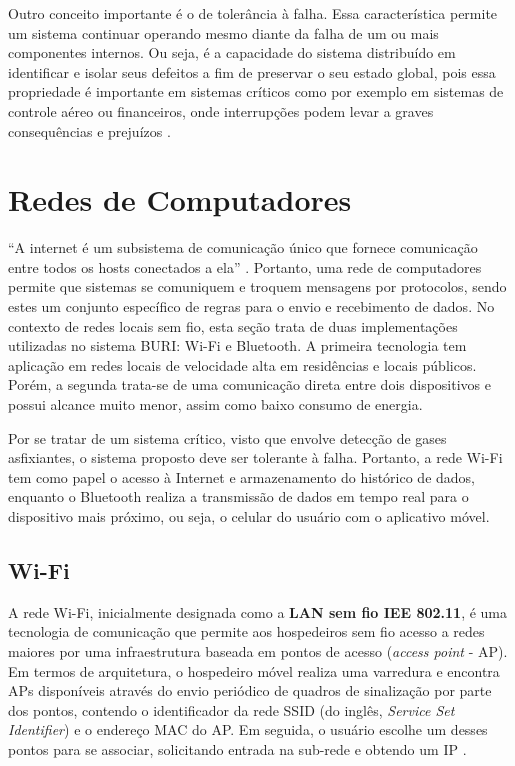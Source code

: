 Outro conceito importante é o de tolerância à falha. Essa característica permite um sistema continuar operando mesmo diante da falha de um ou mais 
componentes internos. Ou seja, é a capacidade do sistema distribuído em identificar e isolar seus defeitos a fim de preservar o seu estado global, pois essa propriedade é 
importante em sistemas críticos como por exemplo em sistemas de controle aéreo ou financeiros, onde interrupções podem levar a graves consequências e prejuízos \cite[pp. 528]{sistemas-distribuidos-coulouris2013}.

\section{Redes de Computadores}

``A internet é um subsistema de comunicação único que fornece comunicação entre todos os hosts conectados a ela'' \cite[pp. 96]{sistemas-distribuidos-coulouris2013}. Portanto, uma rede de computadores 
permite que sistemas se comuniquem e troquem mensagens por protocolos, sendo estes um conjunto específico de regras para o envio e recebimento de dados. No contexto de redes locais sem fio, esta seção trata de duas 
implementações utilizadas no sistema BURI: Wi-Fi e Bluetooth. A primeira tecnologia tem aplicação em redes locais de velocidade alta em residências e locais públicos. Porém, a segunda trata-se de uma comunicação direta entre dois 
dispositivos e possui alcance muito menor, assim como baixo consumo de energia.

Por se tratar de um sistema crítico, visto que envolve detecção de gases asfixiantes, o sistema proposto deve ser tolerante à falha. Portanto, a rede Wi-Fi tem como papel o acesso à Internet e armazenamento do histórico de dados, enquanto o 
Bluetooth realiza a transmissão de dados em tempo real para o dispositivo mais próximo, ou seja, o celular do usuário com o aplicativo móvel.

\subsection{Wi-Fi}

A rede Wi-Fi, inicialmente designada como a \textbf{LAN sem fio IEE 802.11}, é uma tecnologia de comunicação 
que permite aos hospedeiros sem fio acesso a redes maiores por uma infraestrutura baseada em pontos de acesso (\textit{access point} - AP). Em termos 
de arquitetura, o hospedeiro móvel realiza uma varredura e encontra APs disponíveis através do envio periódico de quadros de sinalização por parte dos pontos, contendo o identificador da 
rede SSID (do inglês, \textit{Service Set Identifier}) e o endereço MAC do AP. Em seguida, o usuário escolhe um desses pontos para 
se associar, solicitando entrada na sub-rede e obtendo um IP \cite{redeskurose2010}. 

